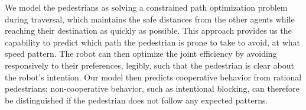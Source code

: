 \documentclass[conference]{IEEEtran}
\begin{document}

We model the pedestrians as solving a constrained path optimization 
problem during traversal, which maintains the safe distances from the other agents while reaching 
their destination as quickly as possible. This approach provides us the 
capability to predict which path the 
pedestrian is prone to take to avoid, at what speed pattern. The robot can 
then optimize the joint efficiency by avoiding responsively to their 
preferences, legibly, such that the pedestrian 
is clear about the robot's intention. Our model then predicts cooperative behavior from rational pedestrians; non-cooperative behavior, such as intentional blocking, can therefore be distinguished if the pedestrian does not follow any expected patterns.


\end{document}
